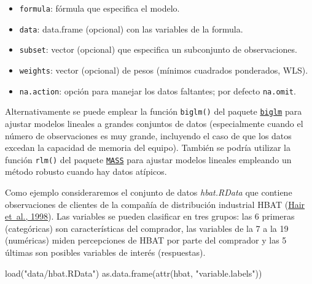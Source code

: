 \documentclass[
]{book}
\newenvironment{Shaded}{\begin{snugshade}}{\end{snugshade}}
\newcommand{\FunctionTok}[1]{\textcolor[rgb]{0.00,0.00,0.00}{#1}}
\newcommand{\NormalTok}[1]{#1}
\newcommand{\StringTok}[1]{\textcolor[rgb]{0.31,0.60,0.02}{#1}}
\theoremstyle{break}
\theoremstyle{nonumberplain}
\begin{document}
\begin{itemize}
\item
  \texttt{formula}: fórmula que especifica el modelo.
\item
  \texttt{data}: data.frame (opcional) con las variables de la formula.
\item
  \texttt{subset}: vector (opcional) que especifica un subconjunto de observaciones.
\item
  \texttt{weights}: vector (opcional) de pesos (mínimos cuadrados ponderados, WLS).
\item
  \texttt{na.action}: opción para manejar los datos faltantes; por defecto \texttt{na.omit}.
\end{itemize}

Alternativamente se puede emplear la función \texttt{biglm()} del paquete \href{https://CRAN.R-project.org/package=biglm}{\texttt{biglm}} para ajustar modelos lineales a grandes conjuntos de datos (especialmente cuando el número de observaciones es muy grande, incluyendo el caso de que los datos excedan la capacidad de memoria del equipo).
También se podría utilizar la función \texttt{rlm()} del paquete \href{https://CRAN.R-project.org/package=MASS}{\texttt{MASS}} para ajustar modelos lineales empleando un método robusto cuando hay datos atípicos.

Como ejemplo consideraremos el conjunto de datos \emph{hbat.RData} que contiene observaciones de clientes de la compañía de distribución industrial HBAT (\protect\hyperlink{ref-hair1998multivariate}{Hair et~al., 1998}).
Las variables se pueden clasificar en tres grupos: las 6 primeras (categóricas) son características del comprador, las variables de la 7 a la 19 (numéricas) miden percepciones de HBAT por parte del comprador y las 5 últimas son posibles variables de interés (respuestas).

\begin{Shaded}
\begin{Highlighting}[]
\FunctionTok{load}\NormalTok{(}\StringTok{"data/hbat.RData"}\NormalTok{)}
\FunctionTok{as.data.frame}\NormalTok{(}\FunctionTok{attr}\NormalTok{(hbat, }\StringTok{"variable.labels"}\NormalTok{))}
\end{Highlighting}
\end{Shaded}
\end{document}
